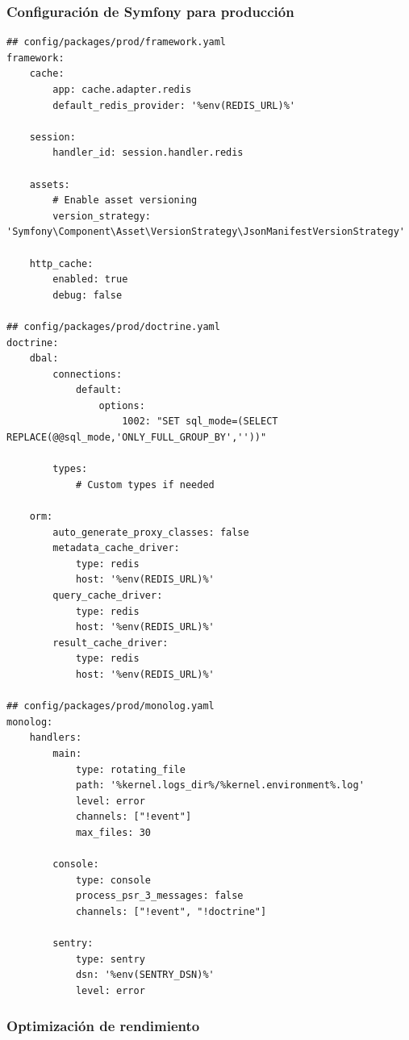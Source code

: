\documentclass[12pt,a4paper,oneside]{report}
\begin{document}
\subsubsection{Configuración de Symfony para
producción}\label{configuraciuxf3n-de-symfony-para-producciuxf3n}

\begin{lstlisting}
## config/packages/prod/framework.yaml
framework:
    cache:
        app: cache.adapter.redis
        default_redis_provider: '%env(REDIS_URL)%'
    
    session:
        handler_id: session.handler.redis
        
    assets:
        # Enable asset versioning
        version_strategy: 'Symfony\Component\Asset\VersionStrategy\JsonManifestVersionStrategy'
    
    http_cache:
        enabled: true
        debug: false

## config/packages/prod/doctrine.yaml
doctrine:
    dbal:
        connections:
            default:
                options:
                    1002: "SET sql_mode=(SELECT REPLACE(@@sql_mode,'ONLY_FULL_GROUP_BY',''))"
                    
        types:
            # Custom types if needed
            
    orm:
        auto_generate_proxy_classes: false
        metadata_cache_driver:
            type: redis
            host: '%env(REDIS_URL)%'
        query_cache_driver:
            type: redis
            host: '%env(REDIS_URL)%'
        result_cache_driver:
            type: redis
            host: '%env(REDIS_URL)%'

## config/packages/prod/monolog.yaml
monolog:
    handlers:
        main:
            type: rotating_file
            path: '%kernel.logs_dir%/%kernel.environment%.log'
            level: error
            channels: ["!event"]
            max_files: 30
            
        console:
            type: console
            process_psr_3_messages: false
            channels: ["!event", "!doctrine"]
            
        sentry:
            type: sentry
            dsn: '%env(SENTRY_DSN)%'
            level: error
\end{lstlisting}

\subsubsection{Optimización de
rendimiento}\label{optimizaciuxf3n-de-rendimiento}
\end{document}
